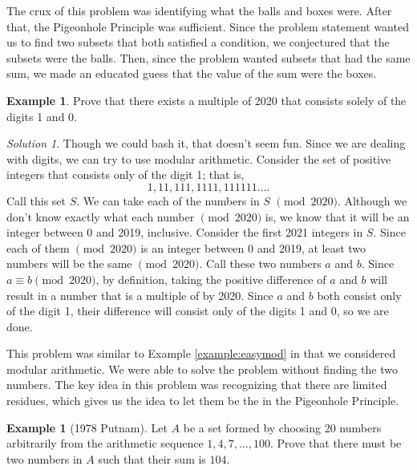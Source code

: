 \documentclass[l1pt]{article}
\theoremstyle{plain}
\theoremstyle{definition}
\newtheorem{example}[thm]{Example}
\theoremstyle{remark}
\newtheorem*{solution}{Solution}
\begin{document}
The crux of this problem was identifying what the balls and boxes were. After that, the Pigeonhole Principle was sufficient. Since the problem statement wanted us to find two subsets that both satisfied a condition, we conjectured that the subsets were the balls. Then, since the problem wanted subsets that had the same sum, we made an educated guess that the value of the sum were the boxes.

\begin{example}
\label{example:2020 mod thing}
Prove that there exists a multiple of 2020 that consists solely of the digits 1 and 0.
\end{example}

\begin{solution}
Though we could bash it, that doesn't seem fun. Since we are dealing with digits, we can try to use modular arithmetic. Consider the set of positive integers that consists only of the digit 1; that is, \[1, 11, 111, 1111, 111111\dots .\] Call this set $S$. We can take each of the numbers in $S$ $\pmod {2020}$. Although we don't know exactly what each number $\pmod {2020}$ is, we know that it will be an integer between 0 and 2019, inclusive. Consider the first 2021 integers in $S$. Since each of them $\pmod{2020}$ is an integer between 0 and 2019, at least two numbers will be the same $\pmod{2020}$. Call these two numbers $a$ and $b$. Since $a\equiv b \pmod{2020}$, by definition, taking the positive difference of $a$ and $b$ will result in a number that is a multiple of by 2020. Since $a$ and $b$ both consist only of the digit 1, their difference will consist only of the digits 1 and 0, so we are done.
\end{solution}

This problem was similar to Example \ref{example:easymod} in that we considered modular arithmetic. We were able to solve the problem without finding the two numbers. The key idea in this problem was recognizing that there are limited residues, which gives us the idea to let them be the  in the Pigeonhole Principle.

\begin{example}[1978 Putnam]
Let $A$ be a set formed by choosing 20 numbers arbitrarily from the arithmetic sequence $1, 4, 7, \dots, 100$. Prove that there must be two numbers in $A$ such that their sum is $104$.
\end{example}
\end{document}
